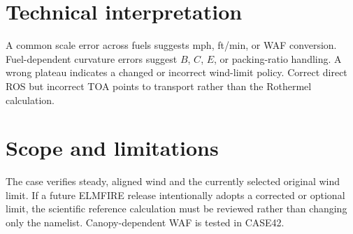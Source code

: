 \section{Technical interpretation}
A common scale error across fuels suggests mph, ft/min, or WAF conversion.  Fuel-dependent curvature errors suggest $B$, $C$, $E$, or packing-ratio handling.  A wrong plateau indicates a changed or incorrect wind-limit policy.  Correct direct ROS but incorrect TOA points to transport rather than the Rothermel calculation.

\section{Scope and limitations}
The case verifies steady, aligned wind and the currently selected original wind limit.  If a future ELMFIRE release intentionally adopts a corrected or optional limit, the scientific reference calculation must be reviewed rather than changing only the namelist.  Canopy-dependent WAF is tested in CASE42.
